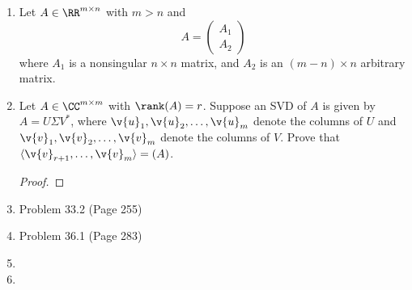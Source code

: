 \documentclass[11pt]{article}
\begin{document}
\begin{enumerate}
\begin{enumerate}
                \begin{proof}
                    
                \end{proof}

            \item[(b)]
                $a_{ii}^{(k)} \le a_{ii}^{(k-1)}$ for all $k \le i \le n$,
                $k = 1, \cdots, n - 1$.

                \begin{proof}
                    
                \end{proof}
        \end{enumerate}

    \item %
        Let $A \in \RR^{m \times n}$ with $m > n$ and
        \[
            A = 
            \begin{pmatrix}
                A_1 \\
                A_2
            \end{pmatrix}
        \]
        where $A_1$ is a nonsingular $n \times n$ matrix, and $A_2$ is an
        $(m - n) \times n$ arbitrary matrix.

    \item %
        Let $A \in \CC^{m \times m}$ with $\rank(A) = r$.
        Suppose an SVD of $A$ is given by $A = U\Sigma V^*$, where
        $\v{u}_1, \v{u}_2, \ldots, \v{u}_m$ denote the columns of $U$ and
        $\v{v}_1, \v{v}_2, \ldots, \v{v}_m$ denote the columns of $V$.
        Prove that $\langle\v{v}_{r+1}, \ldots, \v{v}_m\rangle = \null(A)$.

        \begin{proof}
            
        \end{proof}

    \item %
        Problem 33.2 (Page 255) 

    \item %
        Problem 36.1 (Page 283)

    \item %
        

    \item %

\end{enumerate}
\end{document}
